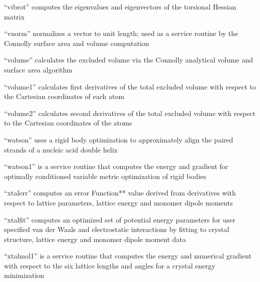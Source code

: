 \documentclass[letterpaper,11pt,english]{sphinxmanual}
\begin{document}

“vibrot” computes the eigenvalues and eigenvectors of the torsional Hessian matrix


“vnorm” normalizes a vector to unit length; used as a service routine by the Connolly surface area and volume computation


“volume” calculates the excluded volume via the Connolly analytical volume and surface area algorithm


“volume1” calculates first derivatives of the total excluded volume with respect to the Cartesian coordinates of each atom


“volume2” calculates second derivatives of the total excluded volume with respect to the Cartesian coordinates of the atoms


“watson” uses a rigid body optimization to approximately align the paired strands of a nucleic acid double helix


“watson1” is a service routine that computes the energy and gradient for optimally conditioned variable metric optimization of rigid bodies


“xtalerr” computes an error Function** value derived from derivatives with respect to lattice parameters, lattice energy and monomer dipole moments


“xtalfit” computes an optimized set of potential energy parameters for user specified van der Waals and electrostatic interactions by fitting to crystal structure, lattice energy and monomer dipole moment data


“xtalmol1” is a service routine that computes the energy and numerical gradient with respect to the six lattice lengths and angles for a crystal energy minimization

\end{document}
